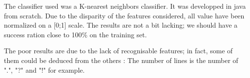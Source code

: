 The classifier used was a K-nearest neighbors classifier. It was developped in java from scratch.
Due to the disparity of the features considered, all value have been normalized on a [0;1] scale.
The results are not a bit lacking; we should have a success ration close to 100\% on the training set.

The poor results are due to the lack of recognisable features; in fact, some of them could be deduced from the others : The number of lines is the number of ".", "?" and "!" for example.